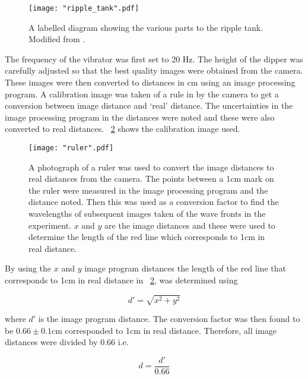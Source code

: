 \documentclass{article}
\newcommand{\figref}[2][\figurename~]{#1\ref{#2}}
\begin{document}
\begin{figure}[h]
\centering
\texttt{[image: "ripple\_tank".pdf]}
\caption{A labelled diagram showing the various parts to the ripple tank. Modified from \cite{Paper01}.}
\label{fig:ripple_tank}
\end{figure}

\vspace{2mm}
\noindent
The frequency of the vibrator was first set to 20 Hz. The height of the dipper was carefully adjusted so that the best quality images were obtained from the camera. These images were then converted to distances in cm using an image processing program. A calibration image was taken of a rule in by the camera to get a conversion between image distance and `real' distance. The uncertainties in the image processing program in the distances were noted and these were also converted to real distances. \figref{fig:ruler} shows the calibration image used. 

\begin{figure}[h]
\centering
\texttt{[image: "ruler".pdf]}
\caption{A photograph of a ruler was used to convert the image distances to real distances from the camera. The points between a 1cm mark on the ruler were measured in the image processing program and the distance noted. Then this was used as a conversion factor to find the wavelengths of subsequent images taken of the wave fronts in the experiment. $x$ and $y$ are the image distances and these were used to determine the length of the red line which corresponds to 1cm in real distance.}
\label{fig:ruler}
\end{figure}

\vspace{2mm}
\noindent
By using the $x$ and $y$ image program distances the length of the red line that corresponds to 1cm in real distance in \figref{fig:ruler}, was determined using 

\vspace{2mm}
\noindent
\begin{equation}
\label{eq:pythagoras}
d' = \sqrt{x^2 + y^2}
\end{equation}

\vspace{2mm}
\noindent
where $d'$ is the image program distance. The conversion factor was then found to be $0.66 \pm 0.1$cm corresponded to 1cm in real distance. Therefore, all image distances were divided by 0.66 i.e. 

\vspace{2mm}
\noindent
\begin{equation}
\label{eq:conversion}
d = \frac{d'}{0.66}
\end{equation}
\end{document}
